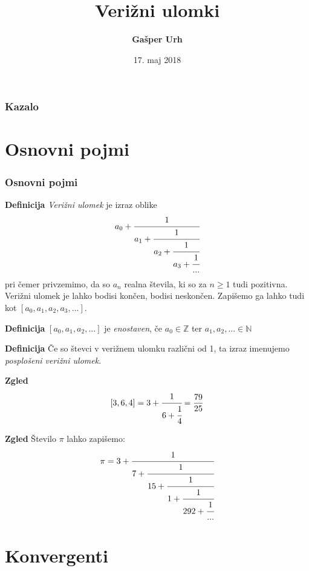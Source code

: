 \documentclass{beamer}
\title[Verižni ulomki]{Verižni ulomki}
\author[Gašper Urh]{\textbf {Gašper Urh}}
\institute[FMF UL]{\textbf {Fakulteta za matematiko in fiziko Univerze v Ljubljani}}
\date{17. maj 2018}
\newcommand{\N}{\mathbb{N}}
\newcommand{\Z}{\mathbb{Z}}
\newenvironment{df}{\begin{block}{\textbf{Definicija}}}{\end{block}}
\newenvironment{zg}{\begin{block}{\textbf{Zgled}}}{\end{block}}
\begin{document}
\begin{frame}
\maketitle
\end{frame}

\begin{frame}
\frametitle{Kazalo}
\tableofcontents
\end{frame}

\section{Osnovni pojmi}

\begin{frame}
\frametitle{Osnovni pojmi}
	\begin{df}
	\textit{Verižni ulomek} je izraz oblike
	\[ a_0 + \cfrac{1}{a_1 + \cfrac{1}{a_2 + \cfrac{1}{a_3 + \cfrac{1}{...}}}} \]
	pri čemer privzemimo, da so $a_n$ realna števila, ki so za $n \geq 1$ tudi pozitivna. Verižni ulomek je lahko bodisi končen, bodisi neskončen.
	\newline
	\newline
	Zapišemo ga lahko tudi kot $[a_0, a_1, a_2, a_3, ...]$.
	\end{df}
\end{frame}

\begin{frame}
	\begin{df}
	$[a_0, a_1, a_2, ...]$ je \textit{enostaven}, če $a_0 \in \Z$ ter $a_1, a_2, ... \in \N$
	\end{df}
	\pause
	\begin{df}
	Če so števci v verižnem ulomku različni od 1, ta izraz imenujemo \textit{posplošeni verižni ulomek}.
	\end{df}
\end{frame}

\begin{frame}
	\begin{zg}
	\[ [3,6,4] = 3 + \cfrac{1}{6+\cfrac{1}{4}} = \frac{79}{25}\]
	\end{zg}
	\pause
	\begin{zg}
	Število $\pi$ lahko zapišemo: \[ \pi = 3 + \cfrac{1}{7 + \cfrac{1}{15 + \cfrac{1}{1 + \cfrac{1}{292 + \cfrac{1}{...}}}}} \]
	\end{zg}
\end{frame}

\section{Konvergenti}
\end{document}
